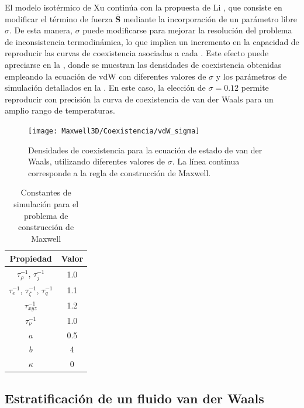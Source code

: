 \FloatBarrier

El modelo isot\'ermico de Xu contin\'ua con la propuesta de Li \cite{li_forcing_2012}, que consiste en modificar el t\'ermino de fuerza $\bar{\bm{S}}$ mediante la incorporaci\'on de un par\'ametro libre $\sigma$. De esta manera, $\sigma$ puede modificarse para mejorar la resoluci\'on del problema de inconsistencia termodin\'amica, lo que implica un incremento en la capacidad de reproducir las curvas de coexistencia asociadas a cada \eos{}. Este efecto puede apreciarse en la , donde se muestran las densidades de coexistencia obtenidas empleando la ecuaci\'on de vdW con diferentes valores de $\sigma$ y los par\'ametros de simulaci\'on detallados en la . En este caso, la elecci\'on de $\sigma=0.12$ permite reproducir con precisi\'on la curva de coexistencia de van der Waals para un amplio rango de temperaturas.

\begin{figure}[ht]
	\centering
	\texttt{[image: Maxwell3D/Coexistencia/vdW\_sigma]}
	\caption{Densidades de coexistencia para la ecuaci\'on de estado de van der Waals, utilizando diferentes valores de $\sigma$. La l\'inea continua corresponde a la regla de construcci\'on de Maxwell. }
	\label{fig:vdW_coex_3D}
\end{figure}

\begin{table}[ht]
	\centering
    \begin{tabular}{c c}
	    \toprule
        \bf Propiedad & \bf Valor \\
        \midrule
        $\tau_{\rho}^{-1}$, $\tau_{j}^{-1}$ & 1.0\\
        $\tau_{e}^{-1}$, $\tau_{\zeta}^{-1}$, $\tau_{q}^{-1}$ & 1.1 \\
        $\tau_{xyz}^{-1}$ & 1.2 \\        
        $\tau_{\nu}^{-1}$ & 1.0 \\
		$a$ & 0.5 \\
		$b$ & 4 \\        
        $\kappa$ & 0 \\
        \bottomrule
	\end{tabular}
	\caption{Constantes de simulaci\'on para el problema de construcci\'on de Maxwell}
	\label{tab:mx3D_prop}
\end{table}  




\subsection{Estratificaci\'on de un fluido van der Waals}


